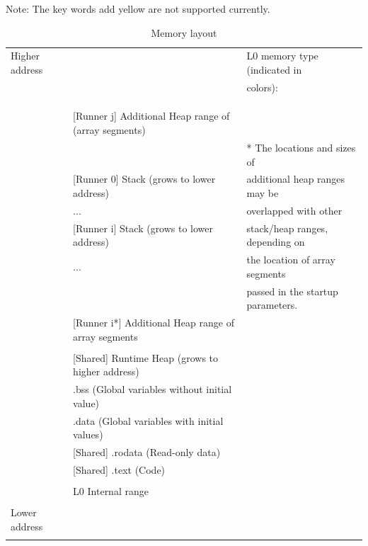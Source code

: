 \documentclass[a4paper]{article}
\begin{document}
\begin{table}[htbp]
\centering
\caption{Memory layout}
\begin{tablenotes}
\small
\centering
\item Note: The key words add yellow are not supported currently.
\end{tablenotes}
\begin{tabular}{|l|l|p{5cm}|}
\hline
Higher address & & L0 memory type (indicated in\\
 & & colors):\\\cline{1-2}
 & & \color{webgreen}{Heap} \\ \cline{1-1}
 & & \color{red!20!white}{Stack} \\ \cline{1-1}
 & & \\ \cline{1-2}
 & \colorbox{webgreen}{[Runner j] Additional Heap range of (array segments)} & \\ \cline{1-2}
 & & * The locations and sizes of\\ \cline{1-2}
 & \colorbox{red!20!white}{[Runner 0] Stack (grows to lower address)} & additional heap ranges may be\\\cline{1-2}
 & \colorbox{red!20!white}{...} & overlapped with other\\\cline{1-2}
 & \colorbox{red!20!white}{[Runner i] Stack (grows to lower address)} & stack/heap ranges, depending on\\\cline{1-2}
 & \colorbox{red!20!white}{...} & the location of array segments\\\cline{1-2}
 & & passed in the startup parameters.\\\cline{1-2}
 & \colorbox{webgreen}{[Runner i*] Additional Heap range of array segments} & \\\cline{1-2}
 & & \\\cline{1-2}
 & \colorbox{webgreen}{[Shared] Runtime Heap (grows to higher address)} & \\\cline{1-2}
 & \colorbox{webgreen}{.bss (Global variables without initial value)} & \\\cline{1-2}
 & \colorbox{webgreen}{.data (Global variables with initial values)} & \\\cline{1-2}
 & \colorbox{webgreen}{[Shared] .rodata (Read-only data)} & \\\cline{1-2}
 & \colorbox{webgreen}{[Shared] .text (Code)} & \\\cline{1-2}
 & & \\\cline{1-2}
 & L0 Internal range & \\\cline{1-2}
 & & \\\cline{1-2}
 Lower address & & \\
 & & \\\cline{1-2}
\hline
\end{tabular}
\label{table:c0-memory}
\end{table}
\end{document}

